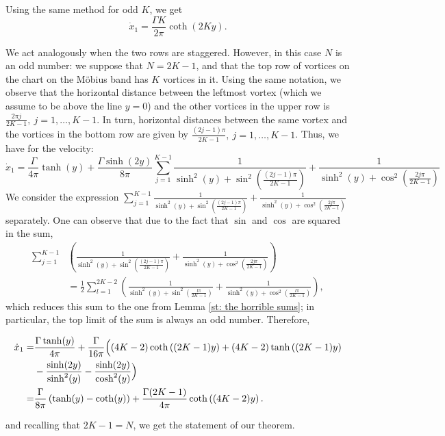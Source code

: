 \documentclass[11pt,twoside]{article}
\theoremstyle{definition}
\numberwithin{equation}{section}
\begin{document}
Using the same method for odd $K$, we get 
\[
\dot{x}_1 = \frac{\Gamma K}{2\pi}\coth(2Ky).
\]

We act analogously when the two rows are staggered. However, in this case $N$ is an odd number: we suppose that $N = 2K-1$, and that the top row of vortices on the chart on the M\"obius band has $K$ vortices in it.  Using the same notation, we observe that the horizontal distance between the leftmost vortex (which we assume to be above the line $y=0$) and the other vortices in the upper row is $\frac{2\pi j}{2K-1},\ j = 1,\ldots,K-1$. In turn, horizontal distances between the same vortex and the vortices in the bottom row are given by $\frac{(2j-1)\pi}{2K-1},  \ j = 1,\ldots,K-1$. Thus, we have for the velocity:
\[
\dot{x}_1 = \frac{\Gamma}{4\pi}\tanh(y) + \frac{\Gamma\sinh(2y)}{8\pi}\sum_{j=1}^{K-1}\frac{1}{\sinh^2(y) + \sin^2\left(\frac{(2j-1)\pi}{2K-1}\right)} + \frac{1}{\sinh^2(y) + \cos^2\left(\frac{2j\pi}{2K-1}\right)}
\]
We consider the expression $\sum_{j=1}^{K-1}\frac{1}{\sinh^2(y) + \sin^2\left(\frac{(2j-1)\pi}{2K-1}\right)} + \frac{1}{\sinh^2(y) + \cos^2\left(\frac{2j\pi}{2K-1}\right)}$ separately. One can observe that due to the fact that $\sin$ and $\cos$ are squared in the sum,
\begin{equation*}
    \begin{split}
\sum_{j=1}^{K-1}&\left(\frac{1}{\sinh^2(y) + \sin^2\left(\frac{(2j-1)\pi}{2K-1}\right)} + \frac{1}{\sinh^2(y) + \cos^2\left(\frac{2j\pi}{2K-1}\right)}\right) \\ 
 &= \frac{1}{2}\sum_{l=1}^{2K-2} \left( \frac{1}{\sinh^2(y) + \sin^2\left(\frac{l\pi}{2K-1}\right)} + \frac{1}{\sinh^2(y) + \cos^2\left(\frac{l\pi}{2K-1}\right)}\right),
\end{split}
\end{equation*}
which reduces this sum to the one from Lemma \ref{st: the horrible sums}; in particular, the top limit of the sum is always an odd number. Therefore,
\begin{small}
\begin{equation}
\begin{split}
\dot{x}_1 =&\frac{\Gamma \tanh (y)}{4 \pi } + \frac{\Gamma }{16\pi}  \Bigl((4K-2)\coth\left((2K-1)y\right) + (4K-2)\tanh\left((2K-1)y\right) \\
&- \frac{\sinh(2y)}{\sinh^2(y)} - \frac{\sinh(2y)}{\cosh^2(y)}\Bigr) \\
=& \frac{\Gamma}{8\pi}\left(\tanh(y) - \coth(y)\right) + \frac{\Gamma(2K-1)}{4\pi}\coth\left((4K-2)y\right).
\end{split}
\end{equation}
\end{small}
and  recalling that $2K-1 = N$, we get the statement of our theorem.
\end{document}
